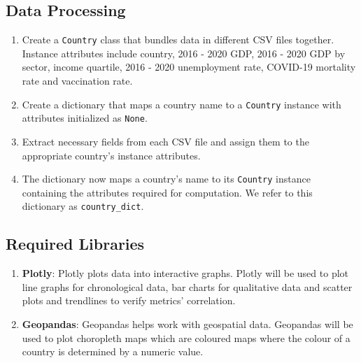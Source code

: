 \documentclass[fontsize=11pt]{article}
\begin{document}
    \subsection*{Data Processing}
    \begin{enumerate}
        \item Create a \texttt{Country} class that bundles data in different CSV files together. Instance attributes include country, 2016 - 2020 GDP, 2016 - 2020 GDP by sector, income quartile, 2016 - 2020 unemployment rate, COVID-19 mortality rate and vaccination rate.
        \item Create a dictionary that maps a country name to a \texttt{Country} instance with attributes initialized as \texttt{None}.
        \item Extract necessary fields from each CSV file and assign them to the appropriate country's instance attributes.
        \item The dictionary now maps a country's name to its \texttt{Country} instance containing the attributes required for computation. We refer to this dictionary as \texttt{country\_dict}.
    \end{enumerate}

    \subsection*{Required Libraries}
    \begin{enumerate}
        \item \textbf{Plotly}: Plotly plots data into interactive graphs. Plotly will be used to plot line graphs for chronological data, bar charts for qualitative data and scatter plots and trendlines to verify metrics' correlation.
        \item \textbf{Geopandas}: Geopandas helps work with geospatial data. Geopandas will be used to plot choropleth maps which are coloured maps where the colour of a country is determined by a numeric value.
    \end{enumerate}
\end{document}
